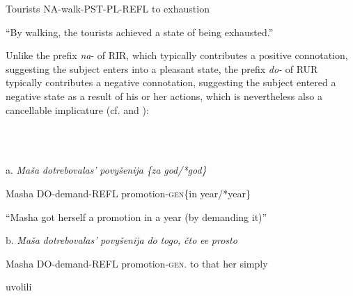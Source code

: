 \documentclass[output=paper,modfonts, nonflat]{langsci/langscibook}
\begin{document}
\begin{styleinnerExample}
\begin{styleinnerExample}
  Tourists   NA-walk-PST-PL-REFL to exhaustion
\end{styleinnerExample}

\begin{styleinnerExample}
  “By walking, the tourists achieved a state of being exhausted.” 
\end{styleinnerExample}

Unlike the prefix \textit{na}{}- of RIR, which typically contributes a positive connotation, suggesting the subject enters into a pleasant state, the prefix \textit{do{}-} of RUR typically contributes a negative connotation, suggesting the subject entered a negative state as a result of his or her actions, which is nevertheless also a cancellable implicature (cf.  and ):

\begin{styleinnerExample}
\ea%
    \label{ex:key:43}
    \gll\\
        \\
    \glt
    \z

          a.  \textit{Maša}   \textit{dotrebovalas’}          \textit{povyšenija}       \textit{\{za} \textit{god/*god\}}
\end{styleinnerExample}

\begin{styleinnerExample}
    Masha DO-demand-REFL promotion-\textsc{gen}\{in year/*year\}
\end{styleinnerExample}

\begin{styleinnerExample}
                     “Masha got herself  a promotion in a year (by demanding it)” 
\end{styleinnerExample}

\begin{styleinnerExample}
  b.  \textit{Maša}   \textit{dotrebovalas’}            \textit{povyšenija}            \textit{do} \textit{togo,} \textit{čto} \textit{ee}   \textit{prosto}
\end{styleinnerExample}

\begin{styleinnerExample}
    Masha DO-demand-REFL   promotion-\textsc{gen.}     to that\textsubscript{}  her simply 
\end{styleinnerExample}

\begin{styleinnerExample}
    uvolili
\end{styleinnerExample}


\end{styleinnerExample}
\end{document}
